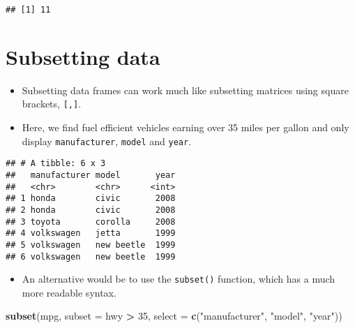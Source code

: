 \documentclass[]{book}
\newenvironment{Shaded}{\begin{snugshade}}{\end{snugshade}}
\newcommand{\DataTypeTok}[1]{\textcolor[rgb]{0.13,0.29,0.53}{#1}}
\newcommand{\DecValTok}[1]{\textcolor[rgb]{0.00,0.00,0.81}{#1}}
\newcommand{\KeywordTok}[1]{\textcolor[rgb]{0.13,0.29,0.53}{\textbf{#1}}}
\newcommand{\NormalTok}[1]{#1}
\newcommand{\OperatorTok}[1]{\textcolor[rgb]{0.81,0.36,0.00}{\textbf{#1}}}
\newcommand{\StringTok}[1]{\textcolor[rgb]{0.31,0.60,0.02}{#1}}
\providecommand{\tightlist}{%
  \setlength{\itemsep}{0pt}\setlength{\parskip}{0pt}}
\begin{document}
\begin{verbatim}
## [1] 11
\end{verbatim}

\hypertarget{subsetting-data}{%
\section{Subsetting data}\label{subsetting-data}}

\begin{itemize}
\tightlist
\item
  Subsetting data frames can work much like subsetting matrices using square brackets, \texttt{{[},{]}}.
\item
  Here, we find fuel efficient vehicles earning over 35 miles per gallon and only display \texttt{manufacturer}, \texttt{model} and \texttt{year}.
\end{itemize}

\begin{Shaded}
\end{Shaded}

\begin{verbatim}
## # A tibble: 6 x 3
##   manufacturer model       year
##   <chr>        <chr>      <int>
## 1 honda        civic       2008
## 2 honda        civic       2008
## 3 toyota       corolla     2008
## 4 volkswagen   jetta       1999
## 5 volkswagen   new beetle  1999
## 6 volkswagen   new beetle  1999
\end{verbatim}

\begin{itemize}
\tightlist
\item
  An alternative would be to use the \texttt{subset()} function, which has a much more readable syntax.
\end{itemize}

\begin{Shaded}
\begin{Highlighting}[]
\KeywordTok{subset}\NormalTok{(mpg, }\DataTypeTok{subset =}\NormalTok{ hwy }\OperatorTok{>}\StringTok{ }\DecValTok{35}\NormalTok{, }\DataTypeTok{select =} \KeywordTok{c}\NormalTok{(}\StringTok{"manufacturer"}\NormalTok{, }\StringTok{"model"}\NormalTok{, }\StringTok{"year"}\NormalTok{))}
\end{Highlighting}
\end{Shaded}
\end{document}
